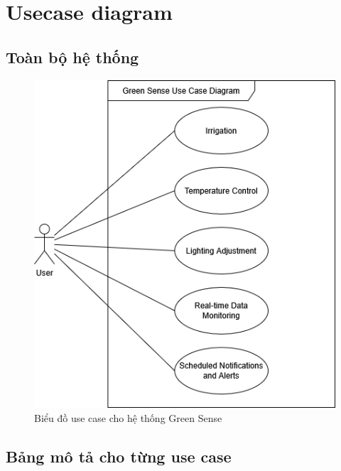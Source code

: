 \section{Usecase diagram}
\subsection{Toàn bộ hệ thống}
\begin{figure}[H]
    \centering
    \includegraphics[width=0.85\linewidth]{content/images/Use Case Diagram.png}
    \caption{Biểu đồ use case cho hệ thống Green Sense}
    \label{fig:useCaseDiagram}
\end{figure}
\subsection{Bảng mô tả cho từng use case}
